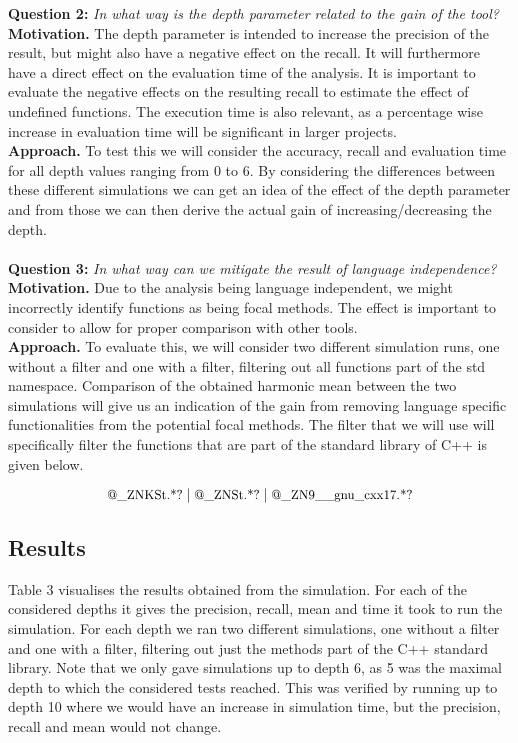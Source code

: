 \documentclass[11pt]{article}
\begin{document}
\begin{multicols}{2}
\noindent
\textbf{Question 2:} \textit{In what way is the depth parameter related to the gain of the tool?}\\
\textbf{Motivation.} The depth parameter is intended to increase the precision of the result, but might also have a negative effect on the recall. It will furthermore have a direct effect on the evaluation time of the analysis. It is important to evaluate the negative effects on the resulting recall to estimate the effect of undefined functions. The execution time is also relevant, as a percentage wise increase in evaluation time will be significant in larger projects.\\
\textbf{Approach.} To test this we will consider the accuracy, recall and evaluation time for all depth values ranging from 0 to 6. By considering the differences between these different simulations we can get an idea of the effect of the depth parameter and from those we can then derive the actual gain of increasing/decreasing the depth. \\
\\
\noindent
\textbf{Question 3:} \textit{In what way can we mitigate the result of language independence?}\\
\textbf{Motivation.} Due to the analysis being language independent, we might incorrectly identify functions as being focal methods. The effect is important to consider to allow for proper comparison with other tools. \\
\textbf{Approach.} To evaluate this, we will consider two different simulation runs, one without a filter and one with a filter, filtering out all functions part of the std namespace. Comparison of the obtained harmonic mean between the two simulations will give us an indication of the gain from removing language specific functionalities from the potential focal methods. The filter that we will use will specifically filter the functions that are part of the standard library of C++ is given below.

\[\text{\small @\_ZNKSt.*?}\mid \text{\small @\_ZNSt.*?}\mid \text{\small @\_ZN9\_\_gnu\_cxx17.*?}\]

\subsection{Results}
Table 3 visualises the results obtained from the simulation. For each of the considered depths it gives the precision, recall, mean and time it took to run the simulation. For each depth we ran two different simulations, one without a filter and one with a filter, filtering out just the methods part of the C++ standard library. Note that we only gave simulations up to depth 6, as 5 was the maximal depth to which the considered tests reached. This was verified by running up to depth 10 where we would have an increase in simulation time, but the precision, recall and mean would not change.


\end{multicols}
\end{document}

